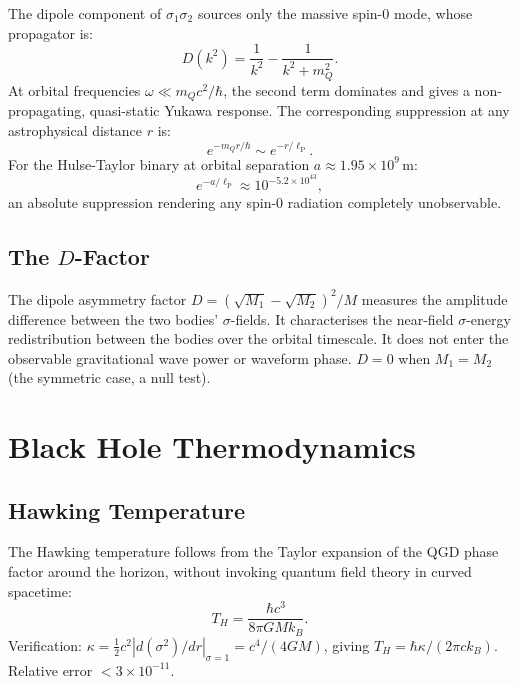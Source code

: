 \documentclass[12pt,a4paper]{article}
\newcommand{\lP}{\ell_{\mathrm{P}}}
\newcommand{\mQ}{m_Q}
\begin{document}
The dipole component of $\sigma_1\sigma_2$ sources only the massive spin-0 mode,
whose propagator is:
\begin{equation}
  D(k^2) = \frac{1}{k^2} - \frac{1}{k^2 + \mQ^2}.
\end{equation}
At orbital frequencies $\omega\ll \mQ c^2/\hbar$, the second term dominates and
gives a non-propagating, quasi-static Yukawa response. The corresponding
suppression at any astrophysical distance $r$ is:
\begin{equation}
  e^{-\mQ r/\hbar} \sim e^{-r/\lP}.
\end{equation}
For the Hulse-Taylor binary at orbital separation $a \approx 1.95\times10^9\,\mathrm{m}$:
\begin{equation}
  e^{-a/\lP} \approx 10^{-5.2\times10^{43}},
\end{equation}
an absolute suppression rendering any spin-0 radiation completely unobservable.

\subsection{The $D$-Factor}

The dipole asymmetry factor $D = (\sqrt{M_1}-\sqrt{M_2})^2/M$ measures the amplitude
difference between the two bodies' $\sigma$-fields. It characterises the near-field
$\sigma$-energy redistribution between the bodies over the orbital timescale.
It does not enter the observable gravitational wave power or waveform phase.
$D = 0$ when $M_1 = M_2$ (the symmetric case, a null test).

\section{Black Hole Thermodynamics}

\subsection{Hawking Temperature}

The Hawking temperature follows from the Taylor expansion of the QGD phase factor
around the horizon, without invoking quantum field theory in curved spacetime:
\begin{equation}
  \boxed{T_H = \frac{\hbar c^3}{8\pi GMk_B}.}
\end{equation}
Verification: $\kappa = \tfrac{1}{2}c^2|d(\sigma^2)/dr|_{\sigma=1} = c^4/(4GM)$,
giving $T_H = \hbar\kappa/(2\pi c k_B)$. Relative error $< 3\times10^{-11}$.
\end{document}
